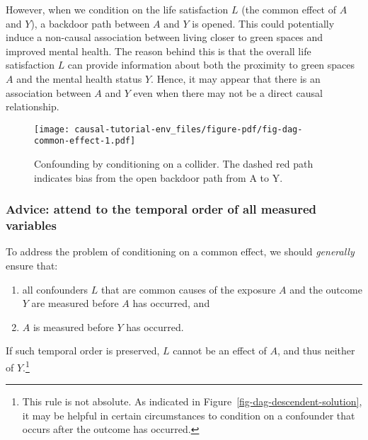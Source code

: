 \documentclass[
  singlecolumn]{article}
\providecommand{\tightlist}{%
  \setlength{\itemsep}{0pt}\setlength{\parskip}{0pt}}\usepackage{longtable,booktabs,array}
\begin{document}
However, when we condition on the life satisfaction \(L\) (the common
effect of \(A\) and \(Y\)), a backdoor path between \(A\) and \(Y\) is
opened. This could potentially induce a non-causal association between
living closer to green spaces and improved mental health. The reason
behind this is that the overall life satisfaction \(L\) can provide
information about both the proximity to green spaces \(A\) and the
mental health status \(Y\). Hence, it may appear that there is an
association between \(A\) and \(Y\) even when there may not be a direct
causal relationship.

\begin{figure}

{\centering \texttt{[image: causal-tutorial-env\_files/figure-pdf/fig-dag-common-effect-1.pdf]}

}

\caption{\label{fig-dag-common-effect}Confounding by conditioning on a
collider. The dashed red path indicates bias from the open backdoor path
from A to Y.}

\end{figure}

\hypertarget{advice-attend-to-the-temporal-order-of-all-measured-variables-1}{%
\subsubsection{Advice: attend to the temporal order of all measured
variables}\label{advice-attend-to-the-temporal-order-of-all-measured-variables-1}}

To address the problem of conditioning on a common effect, we should
\emph{generally} ensure that:

\begin{enumerate}
\def\labelenumi{\arabic{enumi}.}
\tightlist
\item
  all confounders \(L\) that are common causes of the exposure \(A\) and
  the outcome \(Y\) are measured before \(A\) has occurred, and
\item
  \(A\) is measured before \(Y\) has occurred.
\end{enumerate}

If such temporal order is preserved, \(L\) cannot be an effect of \(A\),
and thus neither of \(Y\).\footnote{This rule is not absolute. As
  indicated in Figure~\ref{fig-dag-descendent-solution}, it may be
  helpful in certain circumstances to condition on a confounder that
  occurs after the outcome has occurred.}
\end{document}
